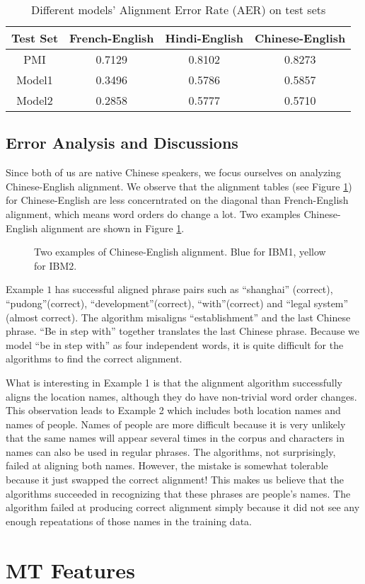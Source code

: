 \documentclass[letterpaper]{article}
\begin{document}
\begin{table}
\begin{center}
\begin{tabular}{cccc}
\hline
\textbf{Test Set} & French-English & Hindi-English & Chinese-English \\
\hline
PMI & 0.7129 & 0.8102 & 0.8273 \\
Model1 & 0.3496 &  0.5786 &   0.5857 \\
Model2 & 0.2858 & 0.5777 & 0.5710 \\
\hline
\end{tabular}
\caption{Different models' Alignment Error Rate (AER) on test sets}\label{tab:test_result}
\end{center}
\end{table}

\subsection{Error Analysis and Discussions}
Since both of us are native Chinese speakers, we focus ourselves on analyzing Chinese-English alignment. We observe that the alignment tables (see Figure \ref{img:align}) for Chinese-English are less concerntrated on the diagonal than French-English alignment, which means word orders do change a lot.
Two examples Chinese-English alignment are shown in Figure \ref{img:align}.
\begin{figure}
\begin{center}
\caption{Two examples of Chinese-English alignment. Blue for IBM1, yellow for IBM2.}\label{img:align}
\end{center}
\end{figure}
Example $1$ has successful aligned phrase pairs such as ``shanghai'' (correct), ``pudong''(correct), ``development''(correct), ``with''(correct) and ``legal system'' (almost correct). The algorithm misaligns ``establishment'' and the last Chinese phrase. ``Be in step with'' together translates the last Chinese phrase. Because we model ``be in step with'' as four independent words, it is quite difficult for the algorithms to find the correct alignment.

What is interesting in Example 1 is that the alignment algorithm successfully aligns the location names, although they do have non-trivial word order changes.
This observation leads to Example 2 which includes both location names and names of people.
Names of people are more difficult because it is very unlikely that the same names will appear several times in the corpus and characters in names can also be used 
in regular phrases.
The algorithms, not surprisingly, failed at aligning both names.
However, the mistake is somewhat tolerable because it just swapped the correct alignment! This makes us believe that the algorithms succeeded in recognizing that these phrases are people's names. The algorithm failed at producing correct alignment simply because it did not see any enough repeatations of those names in the training data.

\section{MT Features}



\end{document}
